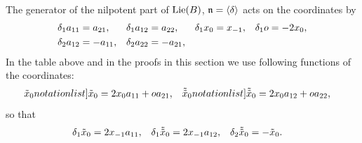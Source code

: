 The generator of the nilpotent part of $\mathrm{Lie}(B)$, $\mathfrak{n}=\langle \delta\rangle$ acts on the coordinates by
\begin{align*}
\dlto\exaoo &= \exato,&\dlto\exaot & = \exatt,&\dlto\xz & = \xmo,&\dlto\xo & = -2\xz,
\\
\dltt\exaot & = -\exaoo,&\dltt\exatt&=-\exato, %
\end{align*}
In the table above and in the proofs in this section we use following functions of the coordinates:
\begin{align*}
\SymbolPrint{\txz} & = 2\xz \exaoo + \xo\exato, & \SymbolPrint{\ttxz} & = 2 \xz \exaot + \xo \exatt,
\end{align*}
so that
\begin{align*}
\delta_{1}\tilde{x}_0 & = 2x_{-1}a_{11}, & \delta_{1} \tilde{\tilde{x}}_0 &= 2x_{-1} a_{12}, & \delta_{2}\tilde{\tilde{x}}_0 & = -\tilde{x}_0.
\end{align*}%
%
%

